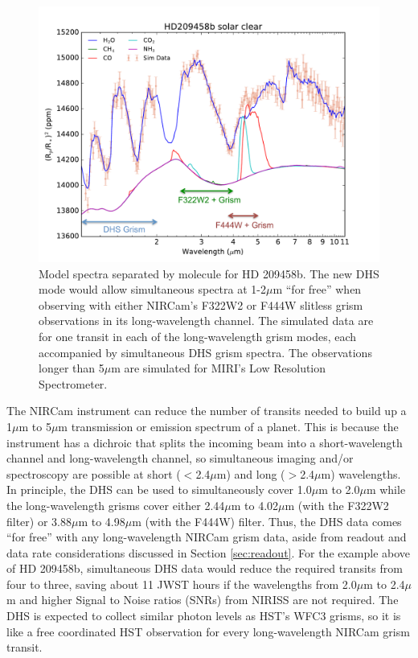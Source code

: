 \documentclass[iop]{emulateapj}
\begin{document}
\begin{figure}[t]
\centering
\includegraphics[width=1.0\columnwidth]{molecules_DHS_HD209.pdf}
\caption{Model spectra separated by molecule for HD 209458b.
The new DHS mode would allow simultaneous spectra at 1-2$\mu$m ``for free'' when observing with either NIRCam's F322W2 or F444W slitless grism observations in its long-wavelength channel.
The simulated data are for one transit in each of the long-wavelength grism modes, each accompanied by simultaneous DHS grism spectra.
The observations longer than 5$\mu$m are simulated for MIRI's Low Resolution Spectrometer.}\label{fig:209spec}
\end{figure}


The NIRCam instrument can reduce the number of transits needed to build up a 1$\mu$m to 5$\mu$m transmission or emission spectrum of a planet.
This is because the instrument has a dichroic that splits the incoming beam into a short-wavelength channel and long-wavelength channel, so simultaneous imaging and/or spectroscopy are possible at short ($<$2.4$\mu$m) and long ($>$2.4$\mu$m) wavelengths.
In principle, the DHS can be used to simultaneously cover 1.0$\mu$m to 2.0$\mu$m while the long-wavelength grisms cover either 2.44$\mu$m to 4.02$\mu$m (with the F322W2 filter) or 3.88$\mu$m to 4.98$\mu$m (with the F444W) filter.
Thus, the DHS data comes ``for free'' with any long-wavelength NIRCam grism data, aside from readout and data rate considerations discussed in Section \ref{sec:readout}.
For the example above of HD 209458b, simultaneous DHS data would reduce the required transits from four to three, saving about 11 JWST hours 
if the wavelengths from 2.0$\mu$m to 2.4$\mu$m and higher Signal to Noise ratios (SNRs) from NIRISS are not required.
The DHS is expected to collect similar photon levels as HST's WFC3 grisms, so it is like a free coordinated HST observation for every long-wavelength NIRCam grism transit.
\end{document}
